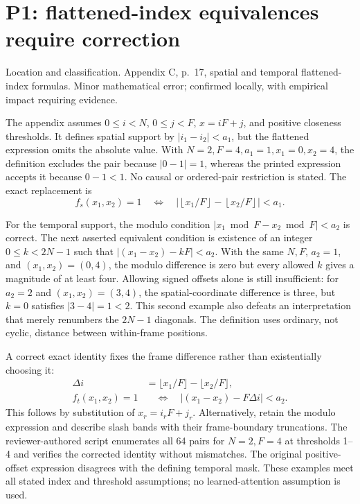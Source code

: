 \documentclass[10pt]{article}
\begin{document}
\section*{P1: flattened-index equivalences require correction}
Location and classification. Appendix C, p. 17, spatial and temporal flattened-index formulas. Minor mathematical error; confirmed locally, with empirical impact requiring evidence.\par
The appendix assumes \(0\le i<N\), \(0\le j<F\), \(x=iF+j\), and positive closeness thresholds. It defines spatial support by \(|i_1-i_2|<a_1\), but the flattened expression omits the absolute value. With \(N=2,F=4,a_1=1,x_1=0,x_2=4\), the definition excludes the pair because \(|0-1|=1\), whereas the printed expression accepts it because \(0-1<1\). No causal or ordered-pair restriction is stated. The exact replacement is \[f_s(x_1,x_2)=1\quad\Longleftrightarrow\quad
\left|\left\lfloor x_1/F\right\rfloor-\left\lfloor x_2/F\right\rfloor\right|<a_1.\]\par
For the temporal support, the modulo condition \(|x_1\bmod F-x_2\bmod F|<a_2\) is correct. The next asserted equivalent condition is existence of an integer \(0\le k<2N-1\) such that \(|(x_1-x_2)-kF|<a_2\). With the same \(N,F\), \(a_2=1\), and \((x_1,x_2)=(0,4)\), the modulo difference is zero but every allowed \(k\) gives a magnitude of at least four. Allowing signed offsets alone is still insufficient: for \(a_2=2\) and \((x_1,x_2)=(3,4)\), the spatial-coordinate difference is three, but \(k=0\) satisfies \(|3-4|=1<2\). This second example also defeats an interpretation that merely renumbers the \(2N-1\) diagonals. The definition uses ordinary, not cyclic, distance between within-frame positions.\par
A correct exact identity fixes the frame difference rather than existentially choosing it: \[\begin{aligned}
\Delta i&=\lfloor x_1/F\rfloor-\lfloor x_2/F\rfloor,\\
f_t(x_1,x_2)=1&\quad\Longleftrightarrow\quad
|(x_1-x_2)-F\Delta i|<a_2.\end{aligned}\] This follows by substitution of \(x_r=i_rF+j_r\). Alternatively, retain the modulo expression and describe slash bands with their frame-boundary truncations. The reviewer-authored script enumerates all 64 pairs for \(N=2,F=4\) at thresholds 1–4 and verifies the corrected identity without mismatches. The original positive-offset expression disagrees with the defining temporal mask. These examples meet all stated index and threshold assumptions; no learned-attention assumption is used.\par
\end{document}

